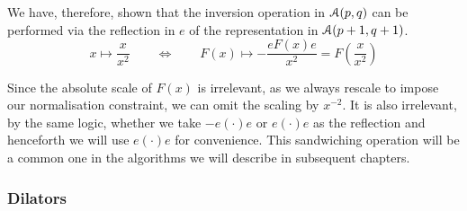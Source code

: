 We have, therefore, shown that the inversion operation in ${\mathcal{A}}(p,q)$ can be
performed via the reflection in $e$ of the representation in ${\mathcal{A}}(p+1,q+1)$.
 \begin{equation} x \mapsto \frac{x}{x^2} \qquad \Leftrightarrow \qquad F(x) \mapsto
 -\frac{eF(x)e}{x^2} = F\left(\frac{x}{x^2}\right) \end{equation}
%

Since the absolute scale of $F(x)$ is irrelevant, as we always rescale to
impose our normalisation constraint, we can omit the scaling by $x^{-2}$.  It
is also irrelevant, by the same logic, whether we take $-e(\cdot)e$ or
$e(\cdot)e$ as the reflection and henceforth we will use $e(\cdot)e$ for
convenience. This sandwiching operation will be a common one in the algorithms
we will describe in subsequent chapters.

\subsubsection{Dilators}


